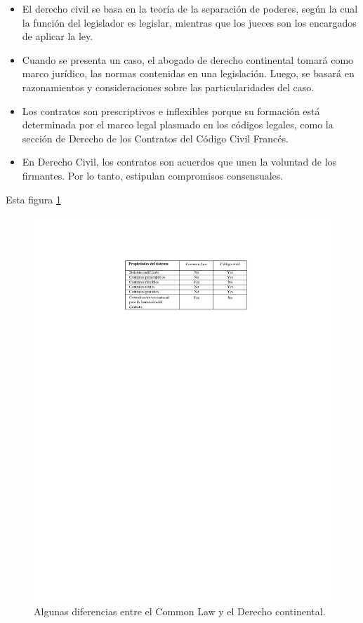 \documentclass[12pt]{report} %
\begin{document}
\begin{itemize}
\begin{itemize}
    \item El derecho civil se basa en la teoría de la separación de poderes, según la cual la función del legislador es legislar, mientras que los jueces son los encargados de aplicar la ley.

    \item Cuando se presenta un caso, el abogado de derecho continental tomará como marco jurídico, las normas contenidas en una legislación. Luego, se basará en razonamientos y consideraciones sobre las particularidades del caso.

    \item Los contratos son prescriptivos e inflexibles porque su formación está determinada por el marco legal plasmado en los códigos legales, como la sección de Derecho de los Contratos del Código Civil Francés.

    \item En Derecho Civil, los contratos son acuerdos que unen la voluntad de los firmantes. Por lo tanto, estipulan compromisos consensuales.
\end{itemize}


Esta figura \ref{tablacontratos2}

\begin{figure}
\centering
\includegraphics[width=0.85\columnwidth]{imagenes/tablacontratos2.pdf}
\caption{Algunas diferencias entre el Common Law y el Derecho continental.}
\label{tablacontratos2}
\end{figure} 


\end{itemize}
\end{document}
